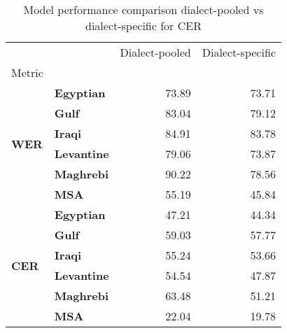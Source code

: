 \begin{table}
\caption{Model performance comparison dialect-pooled vs dialect-specific for CER}
\label{tab:ex_comparison_dialectal}
\begin{tabular}{llrr}
\toprule
 &  & Dialect-pooled & Dialect-specific \\
Metric &  &  &  \\
\midrule
\multirow[t]{6}{*}{\textbf{WER}} & \textbf{Egyptian} & 73.89 & 73.71 \\
\textbf{} & \textbf{Gulf} & 83.04 & 79.12 \\
\textbf{} & \textbf{Iraqi} & 84.91 & 83.78 \\
\textbf{} & \textbf{Levantine} & 79.06 & 73.87 \\
\textbf{} & \textbf{Maghrebi} & 90.22 & 78.56 \\
\textbf{} & \textbf{MSA} & 55.19 & 45.84 \\
\cline{1-4}
\multirow[t]{6}{*}{\textbf{CER}} & \textbf{Egyptian} & 47.21 & 44.34 \\
\textbf{} & \textbf{Gulf} & 59.03 & 57.77 \\
\textbf{} & \textbf{Iraqi} & 55.24 & 53.66 \\
\textbf{} & \textbf{Levantine} & 54.54 & 47.87 \\
\textbf{} & \textbf{Maghrebi} & 63.48 & 51.21 \\
\textbf{} & \textbf{MSA} & 22.04 & 19.78 \\
\cline{1-4}
\bottomrule
\end{tabular}
\end{table}
